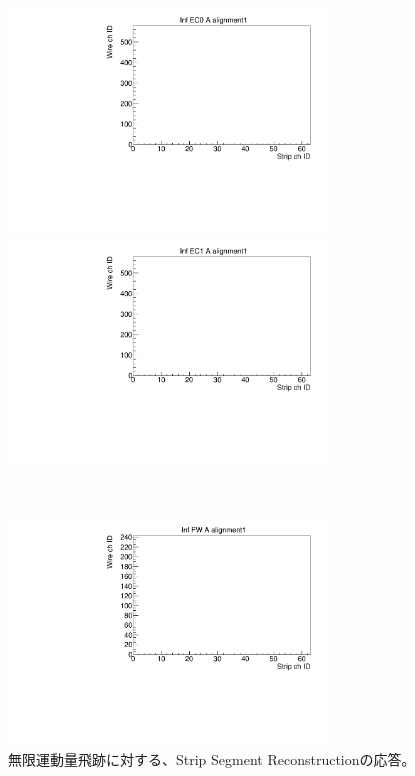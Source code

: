 \begin{figure}
\begin{minipage}[b]{.5\linewidth}
    \centering
    \includegraphics[height=6cm]{fig/Test/A_InfEC0_strip.pdf}
\end{minipage}
\begin{minipage}[b]{.5\linewidth}
    \centering
    \includegraphics[height=6cm]{fig/Test/A_InfEC1_strip.pdf}
\end{minipage}\\
\begin{minipage}[b]{\linewidth}
    \centering
    \includegraphics[height=6cm]{fig/Test/A_InfFW_strip.pdf}
\end{minipage}
\caption[異なる画像形式の比較]{無限運動量飛跡に対する、Strip Segment Reconstructionの応答。}
\label{Inf_A_Strip}
\end{figure}

